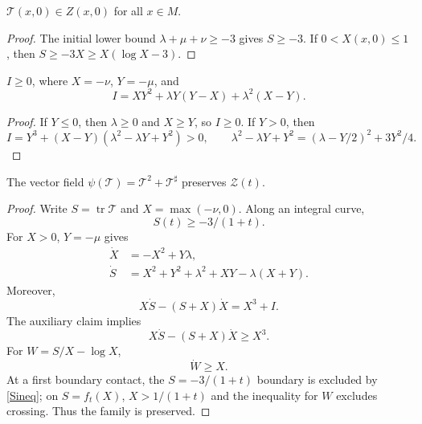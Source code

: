 \begin{claim}
\label{claim:pinching-initial-condition}

${\mathcal T}(x,0)\in Z(x,0)$ for all $x\in M$.
\end{claim}
\begin{proof}
\sketch The initial lower bound $\lambda+\mu+\nu\ge-3$ gives
$S\ge-3$. If $0<X(x,0)\le1$, then $S\ge-3X\ge X(\log X-3)$.
\end{proof}

\begin{claim}
\label{claim:pinching-auxiliary-quantity-nonnegative}


$I\ge0$, where $X=-\nu$, $Y=-\mu$, and
\[
I=XY^2+\lambda Y(Y-X)+\lambda^2(X-Y).
\]
\end{claim}
\begin{proof}
\sketch If $Y\le0$, then $\lambda\ge0$ and $X\ge Y$, so $I\ge0$. If
$Y>0$, then
\[
I=Y^3+(X-Y)(\lambda^2-\lambda Y+Y^2)>0,
\qquad \lambda^2-\lambda Y+Y^2=(\lambda-Y/2)^2+3Y^2/4.
\]
\end{proof}

\begin{claim}
\label{claim:pinching-vector-field-preserves-family}

The vector field $\psi({\mathcal T})={\mathcal T}^2+{\mathcal T}^{\sharp}$
preserves ${\mathcal Z}(t)$.
\end{claim}
\begin{proof}
\sketch Write $S=\operatorname{tr}{\mathcal T}$ and $X=\max(-\nu,0)$.
Along an integral curve,
\begin{equation}\label{Sineq}S(t)\ge-3/(1+t).\end{equation}
For $X>0$, $Y=-\mu$ gives
\begin{align*}
\dot X&=-X^2+Y\lambda,\\
\dot S&=X^2+Y^2+\lambda^2+XY-\lambda(X+Y).
\end{align*}
Moreover,
\begin{equation}\label{dX}X\dot S-(S+X)\dot X=X^3+I.
\end{equation}
The auxiliary claim implies
\begin{equation}\label{dX1}X\dot S-(S+X)\dot X\ge X^3.\end{equation}
For $W=S/X-\log X$,
\begin{equation}\label{dW}\dot W\ge X.
\end{equation}
At a first boundary contact, the $S=-3/(1+t)$ boundary is excluded by
\eqref{Sineq}; on $S=f_t(X)$, $X>1/(1+t)$ and the inequality for $W$
excludes crossing. Thus the family is preserved.
\end{proof}

